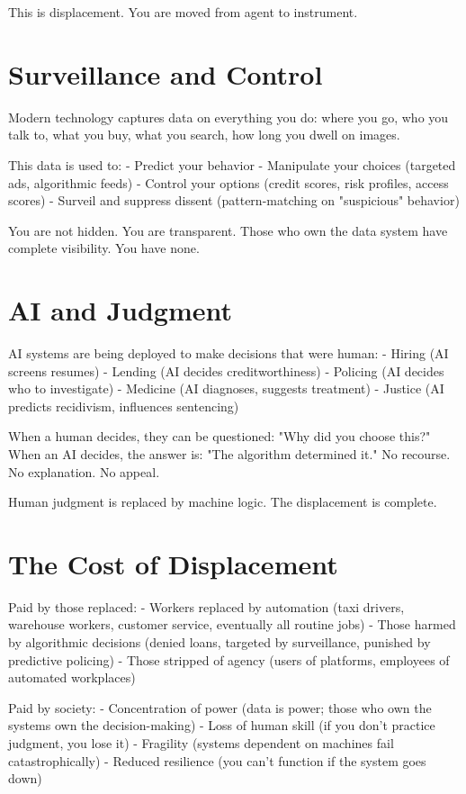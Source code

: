 \documentclass[12pt]{article}
\begin{document}
This is displacement. You are moved from agent to instrument.

\section{Surveillance and Control}

Modern technology captures data on everything you do: where you go, who you talk to, what you buy, what you search, how long you dwell on images.

This data is used to:
- Predict your behavior
- Manipulate your choices (targeted ads, algorithmic feeds)
- Control your options (credit scores, risk profiles, access scores)
- Surveil and suppress dissent (pattern-matching on "suspicious" behavior)

You are not hidden. You are transparent. Those who own the data system have complete visibility. You have none.

\section{AI and Judgment}

AI systems are being deployed to make decisions that were human:
- Hiring (AI screens resumes)
- Lending (AI decides creditworthiness)
- Policing (AI decides who to investigate)
- Medicine (AI diagnoses, suggests treatment)
- Justice (AI predicts recidivism, influences sentencing)

When a human decides, they can be questioned: "Why did you choose this?" When an AI decides, the answer is: "The algorithm determined it." No recourse. No explanation. No appeal.

Human judgment is replaced by machine logic. The displacement is complete.

\section{The Cost of Displacement}

Paid by those replaced:
- Workers replaced by automation (taxi drivers, warehouse workers, customer service, eventually all routine jobs)
- Those harmed by algorithmic decisions (denied loans, targeted by surveillance, punished by predictive policing)
- Those stripped of agency (users of platforms, employees of automated workplaces)

Paid by society:
- Concentration of power (data is power; those who own the systems own the decision-making)
- Loss of human skill (if you don't practice judgment, you lose it)
- Fragility (systems dependent on machines fail catastrophically)
- Reduced resilience (you can't function if the system goes down)
\end{document}
